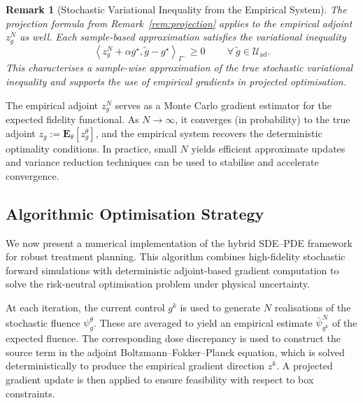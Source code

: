 \documentclass{amsart}
\theoremstyle{plain}
\newtheorem{remark}[theorem]{Remark}
\newcommand{\ltwop}[2]{\ensuremath{\!\left\langle{#1,#2}\right\rangle}}
\newcommand{\Forall}{\:\forall\:}
\newcommand{\Foreach}{\quad\Forall}
\begin{document}
\begin{remark}[Stochastic Variational Inequality from the Empirical System]
  The projection formula from Remark~\ref{rem:projection} applies to
  the empirical adjoint $z_g^N$ as well. Each sample-based
  approximation satisfies the variational inequality
  \begin{equation}
    \ltwop{z_g^N + \alpha g^\star}{\tilde{g} - g^\star}_{\Gamma^-} \geq 0 
    \quad \Foreach \tilde{g} \in \mathcal{U}_{\mathrm{ad}}.
  \end{equation}
  This characterises a sample-wise approximation of the true
  stochastic variational inequality and supports the use of empirical
  gradients in projected optimisation.
\end{remark}

  The empirical adjoint $z_g^N$ serves as a Monte Carlo gradient
  estimator for the expected fidelity functional. As $N \to \infty$,
  it converges (in probability) to the true adjoint $z_g :=
  \mathbf{E}_\theta[z_g^\theta]$, and the empirical system recovers
  the deterministic optimality conditions. In practice, small $N$
  yields efficient approximate updates and variance reduction
  techniques can be used to stabilise and accelerate convergence.

\subsection{Algorithmic Optimisation Strategy}
\label{subsec:algorithm}

We now present a numerical implementation of the hybrid SDE–PDE
framework for robust treatment planning. This algorithm combines
high-fidelity stochastic forward simulations with deterministic
adjoint-based gradient computation to solve the risk-neutral
optimisation problem under physical uncertainty.

At each iteration, the current control $g^k$ is used to generate $N$
realisations of the stochastic fluence $\psi_g^\theta$. These are
averaged to yield an empirical estimate $\bar{\psi}_{g^k}^N$ of the
expected fluence. The corresponding dose discrepancy is used to
construct the source term in the adjoint Boltzmann--Fokker--Planck
equation, which is solved deterministically to produce the empirical
gradient direction $z^k$. A projected gradient update is then applied
to ensure feasibility with respect to box constraints.
\end{document}
